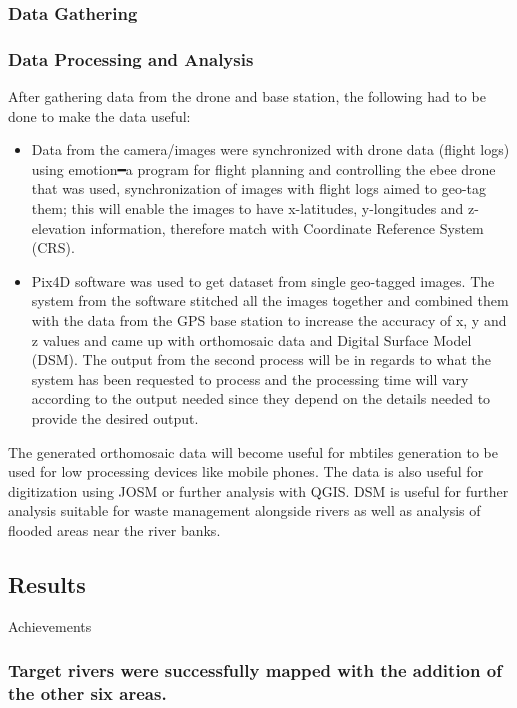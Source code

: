 \documentclass[a4paper,12pt,twoside]{article}
\begin{document}
    \subsubsection{Data Gathering}
    
    \subsubsection{Data Processing and Analysis}
        After gathering data from the drone and base station, the following had to be done to make the data useful:
        \begin{itemize}
            \item Data from the camera/images were synchronized with drone data (flight logs) using emotion━a program for flight planning and controlling the ebee drone that was used, synchronization of images with flight logs aimed to geo-tag them; this will enable the images to have x-latitudes, y-longitudes and z-elevation information, therefore match with Coordinate Reference System (CRS).
            \item Pix4D software was used to get dataset from single geo-tagged images. The system from the software stitched all the images together and combined them with the data from the GPS base station to increase the accuracy of x, y and z values and came up with orthomosaic data and Digital Surface Model (DSM). The output from the second process will be in regards to what the system has been requested to process and the processing time will vary according to the output needed since they depend on the details needed to provide the desired output.
        \end{itemize}
    
        The generated orthomosaic data will become useful for mbtiles generation to be used for low processing devices like mobile phones. The data is also useful for digitization using JOSM or further analysis with QGIS. DSM is useful for further analysis suitable for waste management alongside rivers as well as analysis of flooded areas near the river banks.
    
\subsection{Results}
    Achievements

    \subsubsection{Target rivers were successfully mapped with the addition of the other six areas.}
\end{document}
